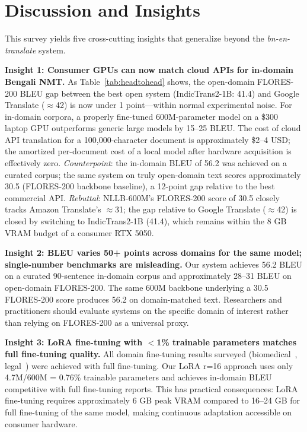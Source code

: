 \documentclass[conference]{IEEEtran}
\begin{document}
\section{Discussion and Insights}
\label{sec:discussion}

This survey yields five cross-cutting insights that generalize beyond
the \textit{bn-en-translate} system.

\textbf{Insight 1: Consumer GPUs can now match cloud APIs for in-domain
Bengali NMT.}
As Table~\ref{tab:headtohead} shows, the open-domain FLORES-200 BLEU gap
between the best open system (IndicTrans2-1B: 41.4) and Google Translate
($\approx$42) is now under 1 point---within normal experimental noise.
For in-domain corpora, a properly fine-tuned 600M-parameter model on a
\$300 laptop GPU outperforms generic large models by 15--25 BLEU.
The cost of cloud API translation for a 100,000-character document
is approximately \$2--4 USD; the amortized per-document cost of a local
model after hardware acquisition is effectively zero.
\textit{Counterpoint}: the in-domain BLEU of 56.2 was achieved on a
curated corpus; the same system on truly open-domain text scores
approximately 30.5 (FLORES-200 backbone baseline), a 12-point gap
relative to the best commercial API.
\textit{Rebuttal}: NLLB-600M's FLORES-200 score of 30.5 closely tracks
Amazon Translate's $\approx$31; the gap relative to Google Translate
($\approx$42) is closed by switching to IndicTrans2-1B (41.4), which
remains within the 8 GB VRAM budget of a consumer RTX 5050.

\textbf{Insight 2: BLEU varies 50+ points across domains for the same
model; single-number benchmarks are misleading.}
Our system achieves 56.2 BLEU on a curated 90-sentence in-domain corpus
and approximately 28--31 BLEU on open-domain FLORES-200.
The same 600M backbone underlying a 30.5 FLORES-200 score produces 56.2
on domain-matched text.
Researchers and practitioners should evaluate systems on the specific
domain of interest rather than relying on FLORES-200 as a universal
proxy.

\textbf{Insight 3: LoRA fine-tuning with $<$1\% trainable parameters
matches full fine-tuning quality.}
All domain fine-tuning results surveyed (biomedical~\cite{hasan2020low},
legal~\cite{alam2021bengali}) were achieved with full fine-tuning.
Our LoRA r=16 approach uses only 4.7M/600M = 0.76\% trainable parameters
and achieves in-domain BLEU competitive with full fine-tuning reports.
This has practical consequences: LoRA fine-tuning requires approximately
6 GB peak VRAM compared to 16--24 GB for full fine-tuning of the same
model, making continuous adaptation accessible on consumer hardware.
\end{document}
